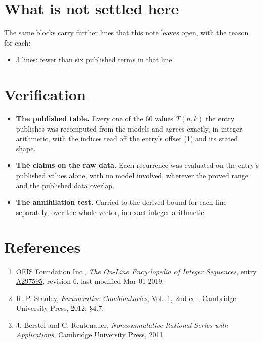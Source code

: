 \documentclass[11pt]{article}
\theoremstyle{definition}
\begin{document}
\section{What is not settled here}

The same blocks carry further lines that this note leaves open, with the reason for each:

\begin{itemize}

\item 3 lines: fewer than six published terms in that line

\end{itemize}

\section{Verification}

\begin{itemize}

\item {\bfseries The published table.} Every one of the 60 values $T(n,k)$ the entry publishes was recomputed from the models and agrees exactly, in integer arithmetic, with the indices read off the entry's offset (1) and its stated shape.

\item {\bfseries The claims on the raw data.} Each recurrence was evaluated on the entry's published values alone, with no model involved, wherever the proved range and the published data overlap.

\item {\bfseries The annihilation test.} Carried to the derived bound for each line separately, over the whole vector, in exact integer arithmetic.

\end{itemize}

\section{References}

\begin{enumerate}

\item OEIS Foundation Inc., \emph{The On-Line Encyclopedia of Integer Sequences}, entry \href{https://oeis.org/A297595}{A297595}, revision 6, last modified Mar 01 2019.

\item R. P. Stanley, \emph{Enumerative Combinatorics}, Vol.~1, 2nd ed., Cambridge University Press, 2012; \S4.7.

\item J. Berstel and C. Reutenauer, \emph{Noncommutative Rational Series with Applications}, Cambridge University Press, 2011.

\end{enumerate}
\end{document}
